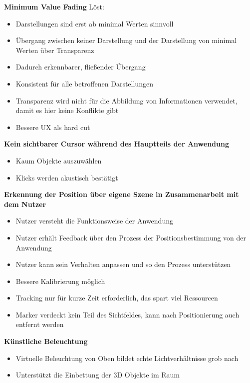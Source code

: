 \textbf{Minimum Value Fading}
Löst: 
\begin{itemize}
	\item Darstellungen sind erst ab minimal Werten sinnvoll
	\item Übergang zwischen keiner Darstellung und der Darstellung von minimal Werten über Transparenz
	\item Dadurch erkennbarer, fließender Übergang
	\item Konsistent für alle betroffenen Darstellungen
	\item Transparenz wird nicht für die Abbildung von Informationen verwendet, damit es hier keine Konflikte gibt
	\item Bessere UX als hard cut
\end{itemize}

\textbf{Kein sichtbarer Cursor während des Hauptteils der Anwendung}
\begin{itemize}
	\item Kaum Objekte auszuwählen
	\item Klicks werden akustisch bestätigt
\end{itemize}

\textbf{Erkennung der Position über eigene Szene in Zusammenarbeit mit dem Nutzer}
\begin{itemize}
	\item Nutzer versteht die Funktionsweise der Anwendung
	\item Nutzer erhält Feedback über den Prozess der Positionsbestimmung von der Anwendung
	\item Nutzer kann sein Verhalten anpassen und so den Prozess unterstützen
	\item Bessere Kalibrierung möglich
	\item Tracking nur für kurze Zeit erforderlich, das spart viel Ressourcen
	\item Marker verdeckt kein Teil des Sichtfeldes, kann nach Positionierung auch entfernt werden
\end{itemize}

\textbf{Künstliche Beleuchtung}
\begin{itemize}
	\item Virtuelle Beleuchtung von Oben bildet echte Lichtverhältnisse grob nach
	\item Unterstützt die Einbettung der 3D Objekte im Raum
\end{itemize}





